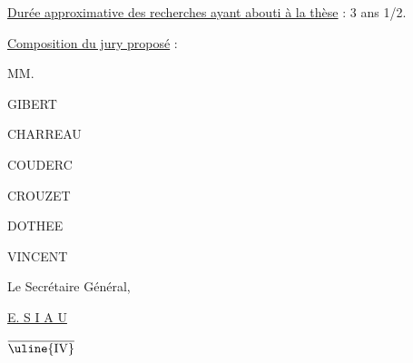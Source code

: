 \uline{Durée approximative des recherches ayant abouti à la thèse} : 3 ans 1/2.

\uline{Composition du jury proposé} :

MM.

GIBERT

CHARREAU

COUDERC

CROUZET

DOTHEE

VINCENT

Le Secrétaire Général,


\uline{E. S I A U}



$\overline{\uline{\mathrm{IV}}}$


